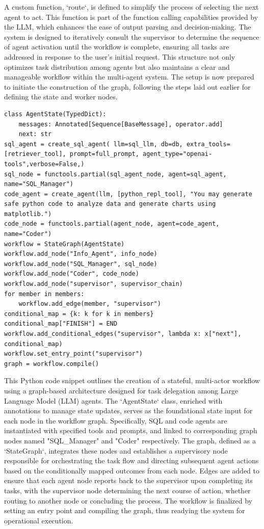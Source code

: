 \documentclass[conference]{IEEEtran}
\begin{document}
A custom function, `route`, is defined to simplify the process of selecting the next agent to act. This function is part of the function calling capabilities provided by the LLM, which enhances the ease of output parsing and decision-making. The system is designed to iteratively consult the supervisor to determine the sequence of agent activation until the workflow is complete, ensuring all tasks are addressed in response to the user's initial request. This structure not only optimizes task distribution among agents but also maintains a clear and manageable workflow within the multi-agent system. The setup is now prepared to initiate the construction of the graph, following the steps laid out earlier for defining the state and worker nodes.

\begin{lstlisting} 
class AgentState(TypedDict):
    messages: Annotated[Sequence[BaseMessage], operator.add]
    next: str
sql_agent = create_sql_agent( llm=sql_llm, db=db, extra_tools=[retriever_tool], prompt=full_prompt, agent_type="openai-tools",verbose=False,)
sql_node = functools.partial(sql_agent_node, agent=sql_agent, name="SQL_Manager")
code_agent = create_agent(llm, [python_repl_tool], "You may generate safe python code to analyze data and generate charts using matplotlib.")
code_node = functools.partial(agent_node, agent=code_agent, name="Coder")
workflow = StateGraph(AgentState)
workflow.add_node("Info_Agent", info_node)
workflow.add_node("SQL_Manager", sql_node)
workflow.add_node("Coder", code_node)
workflow.add_node("supervisor", supervisor_chain)
for member in members:
    workflow.add_edge(member, "supervisor") 
conditional_map = {k: k for k in members}
conditional_map["FINISH"] = END
workflow.add_conditional_edges("supervisor", lambda x: x["next"], conditional_map)
workflow.set_entry_point("supervisor")
graph = workflow.compile()
\end{lstlisting}

This Python code snippet outlines the creation of a stateful, multi-actor workflow using a graph-based architecture designed for task delegation among Large Language Model (LLM) agents. The `AgentState` class, enriched with annotations to manage state updates, serves as the foundational state input for each node in the workflow graph. Specifically, SQL and code agents are instantiated with specified tools and prompts, and linked to corresponding graph nodes named "SQL\_Manager" and "Coder" respectively. The graph, defined as a `StateGraph`, integrates these nodes and establishes a supervisory node responsible for orchestrating the task flow and directing subsequent agent actions based on the conditionally mapped outcomes from each node. Edges are added to ensure that each agent node reports back to the supervisor upon completing its tasks, with the supervisor node determining the next course of action, whether routing to another node or concluding the process. The workflow is finalized by setting an entry point and compiling the graph, thus readying the system for operational execution.
\end{document}
